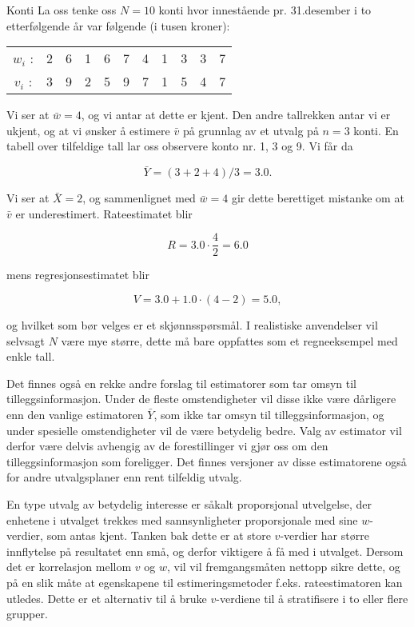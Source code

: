 \begin{eksempel}{Konti}
La oss tenke oss $N = 10$ konti hvor innestående pr. 31.desember i to 
etterfølgende år var følgende (i tusen kroner):
\begin{center}
\begin{tabular}{ccccccccccc}
 $w_i$ : &   2  &  6  &  1  &  6  &  7  &  4  &  1  &  3  &  3  &  7 \\
 $v_i$ : &   3  &  9  &  2  &  5  &  9  &  7  &  1  &  5  &  4  &  7
\end{tabular}
\end{center}
Vi ser at $\bar{w} = 4$, og vi antar at dette er kjent.  Den andre tallrekken
antar vi er ukjent, og at vi ønsker å estimere $\bar{v}$ på
grunnlag av et utvalg på $n = 3$ konti.  En tabell over tilfeldige tall
lar oss observere konto nr. 1, 3 og 9.  Vi får da

\[ \bar{Y}=(3+2+4)/3=3.0.        \]

\noindent Vi ser at $\bar{X} = 2$, og sammenlignet med $\bar{w} = 4$ gir dette 
berettiget mistanke om at $\bar{v}$ er underestimert.  Rateestimatet blir

\[  R=3.0 \cdot \frac{4}{2}=6.0       \]

\noindent mens regresjonsestimatet blir

\[  V=3.0+1.0 \cdot (4-2)=5.0,      \]

\noindent og hvilket som bør velges er et skjønnsspørsmål.
I realistiske anvendelser vil selvsagt $N$ være mye større, dette
 må bare oppfattes som et regneeksempel med enkle tall.
\end{eksempel}

Det finnes også en rekke andre forslag til estimatorer som tar omsyn
til tilleggsinformasjon.  Under de fleste omstendigheter vil disse ikke 
være dårligere enn den vanlige estimatoren $\bar{Y}$, som ikke tar
omsyn til tilleggsinformasjon, og under spesielle omstendigheter vil de
være betydelig bedre.  Valg av estimator vil derfor være delvis
avhengig av de forestillinger vi gjør oss om den tilleggsinformasjon som
foreligger.  Det finnes versjoner av disse estimatorene også for andre
utvalgsplaner enn rent tilfeldig utvalg.

En type utvalg av betydelig interesse er såkalt proporsjonal utvelgelse,
der enhetene i utvalget trekkes med sannsynligheter proporsjonale med
sine $w$-verdier, som antas kjent. Tanken bak dette er at store $v$-verdier
har større innflytelse på resultatet enn små, og derfor viktigere
å få med i utvalget. Dersom det er korrelasjon mellom $v$ og $w$, vil
vil fremgangsmåten nettopp sikre dette, og på en slik måte at
egenskapene til estimeringsmetoder f.eks. rateestimatoren kan utledes.
Dette er et alternativ til å bruke $v$-verdiene til å stratifisere i
to eller flere grupper. 

